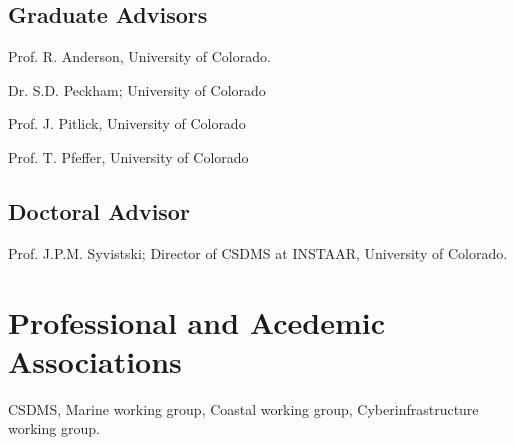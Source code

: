 \documentclass[letterpaper]{resume}
\begin{document}
\subsection{Graduate Advisors}
\begin{multicols}{2}
\begin{compactitem}[\itembullet]
  \item Prof. R. Anderson, University of Colorado.
  \item Dr. S.D. Peckham; University of Colorado
  \item Prof. J. Pitlick, University of Colorado
  \item Prof. T. Pfeffer, University of Colorado
\end{compactitem}
\end{multicols}

\subsection{Doctoral Advisor}
\begin{compactitem}[\itembullet]
  \item Prof. J.P.M. Syvistski; Director of CSDMS at INSTAAR, University of Colorado.
\end{compactitem}

\section{Professional and Acedemic Associations}
CSDMS, Marine working group, Coastal working group, Cyberinfrastructure working group.


\nocite{}
\end{document}
